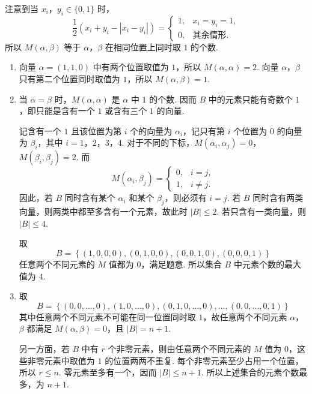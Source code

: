 \begin{solution}
注意到当 \(x_i\)，\(y_i\in\{0,1\}\) 时，
\[
\dfrac12\left(x_i+y_i-|x_i-y_i|\right)=
\begin{cases}
1,&x_i=y_i=1,\\
0,&\text{其余情形}.
\end{cases}
\]
所以 \(M(\alpha,\beta)\) 等于 \(\alpha\)，\(\beta\) 在相同位置上同时取 \(1\) 的个数.

\begin{enumerate}
    \item 向量 \(\alpha=(1,1,0)\) 中有两个位置取值为 \(1\)，所以 \(M(\alpha,\alpha)=2\). 向量 \(\alpha\)，\(\beta\) 只有第二个位置同时取值为 \(1\)，所以 \(M(\alpha,\beta)=1\).
    \item 当 \(\alpha=\beta\) 时，\(M(\alpha,\alpha)\) 是 \(\alpha\) 中 \(1\) 的个数. 因而 \(B\) 中的元素只能有奇数个 \(1\)，即只能是含有一个 \(1\) 或含有三个 \(1\) 的向量.

    记含有一个 \(1\) 且该位置为第 \(i\) 个的向量为 \(\alpha_i\)，记只有第 \(i\) 个位置为 \(0\) 的向量为 \(\beta_i\)，其中 \(i=1\)，\(2\)，\(3\)，\(4\). 对于不同的下标，\(M(\alpha_i,\alpha_j)=0\)，\(M(\beta_i,\beta_j)=2\).
    而
    \[
    M(\alpha_i,\beta_j)=
    \begin{cases}
    0,&i=j,\\
    1,&i\ne j.
    \end{cases}
    \]
    因此，若 \(B\) 同时含有某个 \(\alpha_i\) 和某个 \(\beta_j\)，则必须有 \(i=j\). 若 \(B\) 同时含有两类向量，则两类中都至多含有一个元素，故此时 \(|B|\le2\). 若只含有一类向量，则 \(|B|\le4\).

    取
    \[
    B=\left\{(1,0,0,0),(0,1,0,0),(0,0,1,0),(0,0,0,1)\right\}
    \]
    任意两个不同元素的 \(M\) 值都为 \(0\)，满足题意. 所以集合 \(B\) 中元素个数的最大值为 \(4\).
    \item 取
    \[
    B=\left\{(0,0,\ldots,0),(1,0,\ldots,0),(0,1,0,\ldots,0),\ldots,(0,0,\ldots,0,1)\right\}
    \]
    其中任意两个不同元素不可能在同一位置同时取 \(1\)，故任意两个不同元素 \(\alpha\)，\(\beta\) 都满足 \(M(\alpha,\beta)=0\)，且 \(|B|=n+1\).

    另一方面，若 \(B\) 中有 \(r\) 个非零元素，则由任意两个不同元素的 \(M\) 值为 \(0\)，这些非零元素中取值为 \(1\) 的位置两两不重复. 每个非零元素至少占用一个位置，所以 \(r\le n\). 零元素至多有一个，因而 \(|B|\le n+1\). 所以上述集合的元素个数最多，为 \(n+1\).
\end{enumerate}
\end{solution}
